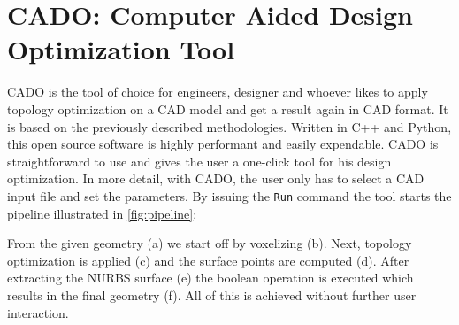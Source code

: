 \section{CADO: Computer Aided Design Optimization Tool}
CADO is the tool of choice for engineers, designer and whoever likes to apply topology optimization on a CAD model and get a result again in CAD format. It is based on the previously described methodologies. Written in C++ and Python, this open source software is highly performant and easily expendable. CADO is straightforward to use and gives the user a one-click tool for his design optimization. In more detail, with CADO, the user only has to select a CAD input file and set the parameters. By issuing the \texttt{Run} command the tool starts the pipeline illustrated in \autoref{fig:pipeline}: 

From the given geometry (a) we start off by voxelizing (b). Next, topology optimization is applied (c) and the surface points are computed (d). After extracting the NURBS surface (e) the boolean operation is executed which results in the final geometry (f). All of this is achieved without further user interaction.
